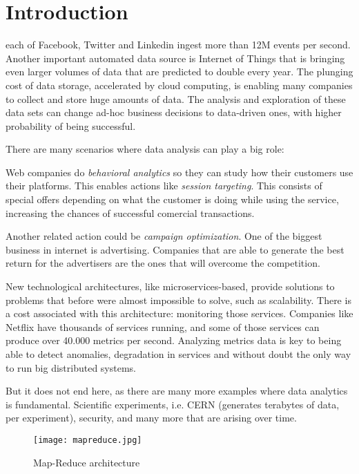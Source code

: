 \chapter{Introduction}
\label{chap:introduction}

 each of Facebook, Twitter and Linkedin \cite{facebook, twitter, linkedin}
ingest more than 12M events per second. Another important automated data source
is Internet of Things \cite{iot} that is bringing even larger volumes of data
that are predicted to double every year. The plunging cost of data storage,
accelerated by cloud computing, is enabling many companies to collect and store
huge amounts of data. The analysis and exploration of these data sets can change
ad-hoc business decisions to data-driven ones, with higher probability of being
successful.

\bigskip

There are many scenarios where data analysis can play a big role:

Web companies do \textit{behavioral analytics} so they can study how their customers use
their platforms. This enables actions like \textit{session targeting}. This consists of
special offers depending on what the customer is doing while using the service,
increasing the chances of successful comercial transactions.

Another related action could be \textit{campaign optimization}. One of the biggest
business in internet is advertising. Companies that are able to generate the best
return for the advertisers are the ones that will overcome the competition.

New technological architectures, like microservices-based, provide solutions to
problems that before were almost impossible to solve, such as scalability. There is
a cost associated with this architecture: monitoring those services. Companies
like Netflix have thousands of services running\cite{netflix}, and some of those
services can produce over 40.000 metrics per second. Analyzing metrics data is
key to being able to detect anomalies, degradation in services and without doubt
the only way to run big distributed systems.

But it does not end here, as there are many more examples where data analytics
is fundamental. Scientific experiments, i.e. CERN (generates terabytes of data, per
experiment)\cite{cern}, security, and many more that are arising over time.

\bigskip

\begin{figure}[!h]
\begin{center}
\texttt{[image: mapreduce.jpg]}
\caption{Map-Reduce architecture\cite{mapreduce}}
\label{fig:mapreduce}
\end{center}
\end{figure}

